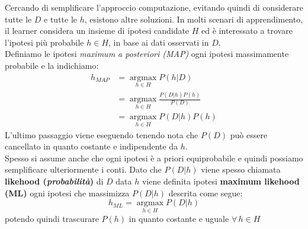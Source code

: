 Cercando di semplificare l'approccio computazione, evitando quindi di considerare tutte le $D$ e tutte le $h$, esistono altre soluzioni. 
In molti scenari di apprendimento, il learner considera un insieme di ipotesi candidate $H$ ed è interessato a trovare l'ipotesi più probabile $h\in H$, in base ai dati osservati in $D$.\\
Definiamo le ipotesi \textit{ maximum a posteriori (MAP)} ogni ipotesi massimamente probabile e la indichiamo:
    \begin{equation*}
        \begin{split}
            h_{MAP}&=\operatorname*{argmax}_{h\in H}P(h|D)\\
            & = \operatorname*{argmax}_{h\in H}\frac{P(D|h)P(h)}{P(D)}\\
            & = \operatorname*{argmax}_{h\in H}P(D|h)P(h)
        \end{split}
    \end{equation*}
L'ultimo passaggio viene eseguendo tenendo nota che $P(D)$ può essere cancellato in quanto costante e indipendente da $h$.\\

Spesso si assume anche che ogni ipotesi è a priori equiprobabile e quindi possiamo semplificare ulteriormente i conti. Dato che $P(D|h)$ viene spesso chiamata \textbf{likehood (\textit{probabilità})} di $D$ data $h$ viene definita ipotesi\textbf{ maximum likehood (ML)} ogni ipotesi che massimizza $P(D|h)$ descrita come segue: \[h_{ML}=\operatorname*{argmax}_{h\in H}P(D|h)\]
potendo quindi trascurare $P(h)$ in quanto costante e uguale $\forall\,h\in H$\\

